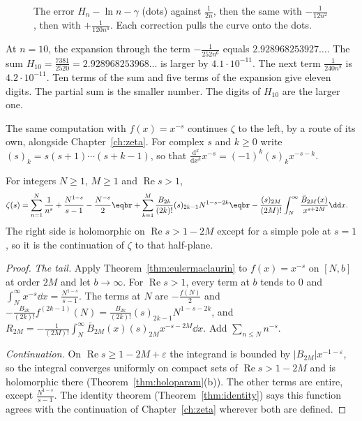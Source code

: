 \begin{figure}[ht]
\centering
{}
\caption{The error $H_n-\ln n-\gamma$ (dots) against $\frac1{2n}$, then the same with $-\frac1{12n^2}$, then with $+\frac1{120n^4}$. Each correction pulls the curve onto the dots.}
\label{fig:rw11-harmonic}
\end{figure}

At $n=10$, the expansion through the term $-\frac1{252n^6}$ equals $2.928968253927\ldots$. The sum $H_{10}=\frac{7381}{2520}=2.928968253968\ldots$ is larger by $4.1\cdot10^{-11}$. The next term $\frac1{240n^8}$ is $4.2\cdot10^{-11}$. Ten terms of the sum and five terms of the expansion give eleven digits. The partial sum is the smaller number. The digits of $H_{10}$ are the larger one.

The same computation with $f(x)=x^{-s}$ continues $\zeta$ to the left, by a route of its own, alongside Chapter~\ref{ch:zeta}. For complex $s$ and $k\ge0$ write $(s)_k=s(s+1)\cdots(s+k-1)$, so that $\frac{\mathrm d^k}{\mathrm dx^k}x^{-s}=(-1)^k(s)_kx^{-s-k}$.

\begin{proposition}\label{prop:zetaem}
For integers $N\ge1$, $M\ge1$ and $\operatorname{Re}s>1$,
\[
\begin{aligned}\zeta(s)&=\sum_{n=1}^N\frac1{n^s}+\frac{N^{1-s}}{s-1}-\frac{N^{-s}}2\eqbr+\sum_{k=1}^M\frac{B_{2k}}{(2k)!}(s)_{2k-1}N^{1-s-2k}\eqbr-\frac{(s)_{2M}}{(2M)!}\int_N^\infty\frac{\bar B_{2M}(x)}{x^{s+2M}}\dd x.\end{aligned}
\]
The right side is holomorphic on $\operatorname{Re}s>1-2M$ except for a simple pole at $s=1$, so it is the continuation of $\zeta$ to that half-plane.
\end{proposition}
\begin{proof}
\emph{The tail.} Apply Theorem~\ref{thm:eulermaclaurin} to $f(x)=x^{-s}$ on $[N,b]$ at order $2M$ and let $b\to\infty$. For $\operatorname{Re}s>1$, every term at $b$ tends to $0$ and $\int_N^\infty x^{-s}\dd x=\frac{N^{1-s}}{s-1}$. The terms at $N$ are $-\frac{f(N)}2$ and $-\frac{B_{2k}}{(2k)!}f^{(2k-1)}(N)=\frac{B_{2k}}{(2k)!}(s)_{2k-1}N^{1-s-2k}$, and $R_{2M}=-\frac1{(2M)!}\int_N^\infty\bar B_{2M}(x)(s)_{2M}x^{-s-2M}\dd x$. Add $\sum_{n\le N}n^{-s}$.

\emph{Continuation.} On $\operatorname{Re}s\ge1-2M+\varepsilon$ the integrand is bounded by $|B_{2M}|x^{-1-\varepsilon}$, so the integral converges uniformly on compact sets of $\operatorname{Re}s>1-2M$ and is holomorphic there (Theorem~\ref{thm:holoparam}(b)). The other terms are entire, except $\frac{N^{1-s}}{s-1}$. The identity theorem (Theorem~\ref{thm:identity}) says this function agrees with the continuation of Chapter~\ref{ch:zeta} wherever both are defined.
\end{proof}

